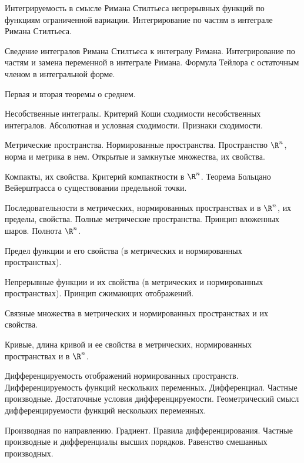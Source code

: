 \documentclass[a4paper]{article}
\begin{document}
\begin{nums}{-2}
\item Интегрируемость в смысле Римана Стилтьеса непрерывных функций по функциям
ограниченной вариации. Интегрирование по частям в интеграле Римана Стилтьеса.

\item Сведение интегралов Римана Стилтьеса к интегралу Римана. Интегрирование по частям
и замена переменной в интеграле Римана. Формула Тейлора с остаточным членом
в интегральной форме.

\item Первая и вторая теоремы о среднем.

\item Несобственные интегралы. Критерий Коши сходимости несобственных интегралов.
Абсолютная и условная сходимости. Признаки сходимости.

\item Метрические пространства. Нормированные пространства. Пространство $\R^n$, норма и
метрика в нем. Открытые и замкнутые множества, их свойства.

\item Компакты, их свойства. Критерий компактности в $\R^n$. Теорема Больцано Вейерштрасса
о существовании предельной точки.

\item Последовательности в метрических, нормированных пространствах и в $\R^n$, их пределы,
свойства. Полные метрические пространства. Принцип вложенных шаров. Полнота $\R^n$.

\item Предел функции и его свойства (в метрических и нормированных пространствах).

\item Непрерывные функции и их свойства (в метрических и нормированных пространствах).
Принцип сжимающих отображений.

\item Связные множества в метрических и нормированных пространствах и их свойства.

\item Кривые, длина кривой и ее свойства в метрических, нормированных пространствах и
в $\R^n$.

\item Дифференцируемость отображений нормированных пространств. Дифференцируемость
функций нескольких переменных. Дифференциал. Частные производные. Достаточные
условия дифференцируемости. Геометрический смысл дифференцируемости функций
нескольких переменных.

\item Производная по направлению. Градиент. Правила дифференцирования.
Частные производные и дифференциалы высших порядков. Равенство смешанных производных.


\end{nums}
\end{document}
